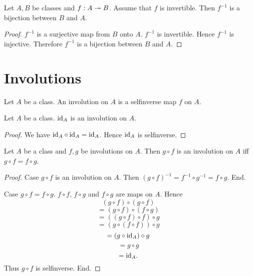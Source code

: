 \documentclass[10pt]{article}
\begin{document}
  \begin{forthel}
    \begin{corollary}
      Let $A, B$ be classes and $f : A \twoheadrightarrow B$.
      Assume that $f$ is invertible.
      Then $f^{-1}$ is a bijection between $B$ and $A$.
    \end{corollary}
    \begin{proof}
      $f^{-1}$ is a surjective map from $B$ onto $A$.
      $f^{-1}$ is invertible.
      Hence $f^{-1}$ is injective.
      Therefore $f^{-1}$ is a bijection between $B$ and $A$.
    \end{proof}
  \end{forthel}


  \section{Involutions}

  \begin{forthel}
    \begin{definition}
      Let $A$ be a class.
      An involution on $A$ is a selfinverse map $f$ on $A$.
    \end{definition}
  \end{forthel}

  \begin{forthel}
    \begin{proposition}
      Let $A$ be a class.
      $\textrm{id}_{A}$ is an involution on $A$.
    \end{proposition}
    \begin{proof}
      We have $\textrm{id}_{A} \circ \textrm{id}_{A} = \textrm{id}_{A}$.
      Hence $\textrm{id}_{A}$ is selfinverse.
    \end{proof}
  \end{forthel}

  \begin{forthel}
    \begin{proposition}
      Let $A$ be a class and $f, g$ be involutions on $A$.
      Then $g \circ f$ is an involution on $A$ iff $g \circ f = f \circ g$.
    \end{proposition}
    \begin{proof}
      Case $g \circ f$ is an involution on $A$.
        Then $(g \circ f)^{-1} = f^{-1} \circ g^{-1} = f \circ g$.
      End.

      Case $g \circ f = f \circ g$.
        $f \circ f$, $f \circ g$ and $f \circ g$ are maps on $A$.
        Hence
        \[  (g \circ f) \circ (g \circ f)       \]
        \[    = (g \circ f) \circ (f \circ g)   \]
        \[    = ((g \circ f) \circ f) \circ g   \]
        \[    = (g \circ (f \circ f)) \circ g   \]
        \[    = (g \circ \textrm{id}_{A}) \circ g       \]
        \[    = g \circ g                       \]
        \[    = \textrm{id}_{A}.                        \]
        Thus $g \circ f$ is selfinverse.
      End.
    \end{proof}
  \end{forthel}
\end{document}
